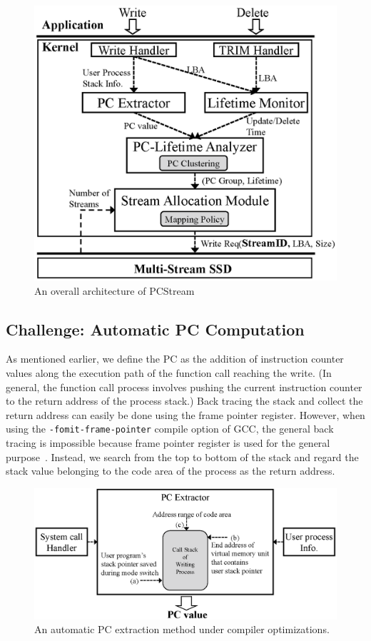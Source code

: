 \begin{figure}[t]
	\centering
	\includegraphics[width=0.8\linewidth]{figure/architecture2}
	\caption{An overall architecture of {\sf PCStream}}
	\label{fig:architecture}
	\vspace{-20pt}
\end{figure}

\subsection{Challenge: Automatic PC Computation}
As mentioned earlier, we define the PC as the addition of instruction counter values along the 
execution path of the function call reaching the write. 
(In general, the function call process involves pushing the current instruction 
counter to the return address of the process stack.) 
Back tracing the stack and collect the return address can easily be done using the frame pointer register. 
However, when using the {\tt -fomit-frame-pointer} compile option of GCC, 
the general back tracing is impossible because frame pointer register is used for the general purpose~\cite{GCC}. 
Instead, we search from the top to bottom of the stack and regard the stack value 
belonging to the code area of the process as the return address. 

\begin{figure}[t]
	\centering
	\includegraphics[width=1\linewidth]{figure/getpc}
	\vspace{-10pt}
	\caption{An automatic PC extraction method under compiler optimizations.}
	\label{fig:getpc}
	\vspace{-20pt}
\end{figure}

